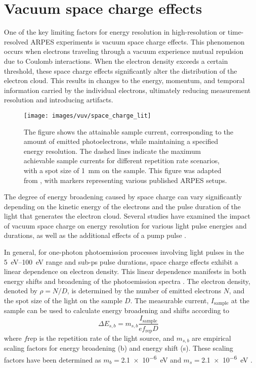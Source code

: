\section{Vacuum space charge effects}
\label{sec:space_charge}

One of the key limiting factors for energy resolution in high-resolution or time-resolved ARPES experiments is vacuum space charge effects.
This phenomenon occurs when electrons traveling through a vacuum experience mutual repulsion due to Coulomb interactions.
When the electron density exceeds a certain threshold, these space charge effects significantly alter the distribution of the electron cloud.
This results in changes to the energy, momentum, and temporal information carried by the individual electrons, ultimately reducing measurement resolution and introducing artifacts.

\begin{figure}[b!]
	\centering
	\texttt{[image: images/vuv/space\_charge\_lit]}
	\caption{The figure shows the attainable sample current, corresponding to the amount of emitted photoelectrons, while maintaining a specified energy resolution. The dashed lines indicate the maximum achievable sample currents for different repetition rate scenarios, with a spot size of \qty{1}{\milli\meter} on the sample. This figure was adapted from \cite{corder_ultrafast_2018}, with markers representing various published ARPES setups.}
	\label{fig:spacechargelit}
\end{figure}

The degree of energy broadening caused by space charge can vary significantly depending on the kinetic energy of the electrons and the pulse duration of the light that generates the electron cloud.
Several studies have examined the impact of vacuum space charge on energy resolution for various light pulse energies and durations, as well as the additional effects of a pump pulse \cite{corder_ultrafast_2018,plotzing_spin-resolved_2016,hellmann_vacuum_2009,graf_vacuum_2010,frietsch_high-order_2013}.

In general, for one-photon photoemission processes involving light pulses in the \qtyrange{5}{100}{\electronvolt} range and sub-\unit{\pico\second} pulse durations, space charge effects exhibit a linear dependence on electron density.
This linear dependence manifests in both energy shifts and broadening of the photoemission spectra \cite{corder_ultrafast_2018,plotzing_spin-resolved_2016}.
The electron density, denoted by $\rho = N/D$, is determined by the number of emitted electrons $N$, and the spot size of the light on the sample $D$.
The measurable current, $I_\text{sample}$ at the sample can be used to calculate energy broadening and shifts according to
\begin{equation}
	\Delta E_{s,b} = m_{s,b} \frac{I_\text{sample}}{e f_\text{rep} D}
	\label{eq:spacecharge}
\end{equation}
where $f\text{rep}$ is the repetition rate of the light source, and $m_{s,b}$ are empirical scaling factors for energy broadening (b) and energy shift (s). These scaling factors have been determined as $m_b=$\qty{2.1e-6}{\electronvolt} and $m_s=$\qty{2.1e-6}{\electronvolt} \cite{plotzing_spin-resolved_2016}.

